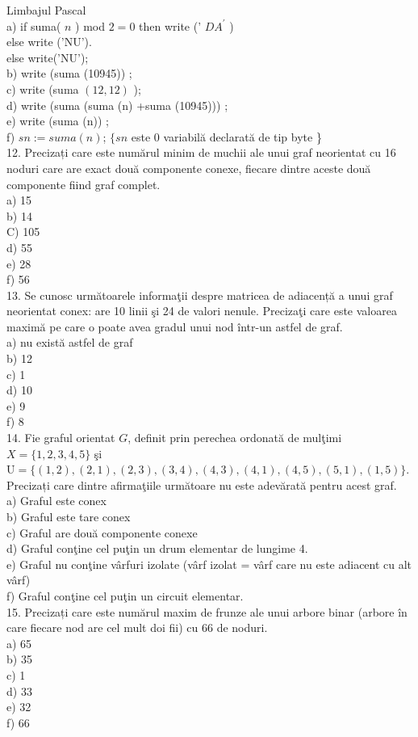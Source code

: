 Limbajul Pascal\\
a) if suma( $n$ ) mod $2=0$ then write (' $D A^{\prime}$ )\\
else write ('NU').\\
else write('NU');\\
b) write (suma (10945)) ;\\
c) write (suma $(12,12)$ );\\
d) write (suma (suma (n) +suma (10945))) ;\\
e) write (suma (n)) ;\\
f) $s n:=s u m a(n)$; $\{s n$ este 0 variabilă declarată de tip byte \}\\
12. Precizați care este numărul minim de muchii ale unui graf neorientat cu 16 noduri care are exact două componente conexe, fiecare dintre aceste două componente fiind graf complet.\\
a) 15\\
b) 14\\
C) 105\\
d) 55\\
e) 28\\
f) 56\\
13. Se cunosc următoarele informaţii despre matricea de adiacență a unui graf neorientat conex: are 10 linii şi 24 de valori nenule. Precizaţi care este valoarea maximă pe care o poate avea gradul unui nod într-un astfel de graf.\\
a) nu există astfel de graf\\
b) 12\\
c) 1\\
d) 10\\
e) 9\\
f) 8\\
14. Fie graful orientat $G$, definit prin perechea ordonată de mulţimi $X=\{1,2,3,4,5\}$ şi $\mathrm{U}=\{(1,2),(2,1),(2,3),(3,4),(4,3),(4,1),(4,5),(5,1),(1,5)\}$.\\
Precizați care dintre afirmaţiile următoare nu este adevărată pentru acest graf.\\
a) Graful este conex\\
b) Graful este tare conex\\
c) Graful are două componente conexe\\
d) Graful conţine cel puţin un drum elementar de lungime 4.\\
e) Graful nu conţine vârfuri izolate (vârf izolat = vârf care nu este adiacent cu alt vârf)\\
f) Graful conţine cel puţin un circuit elementar.\\
15. Precizați care este numărul maxim de frunze ale unui arbore binar (arbore în care fiecare nod are cel mult doi fii) cu 66 de noduri.\\
a) 65\\
b) 35\\
c) 1\\
d) 33\\
e) 32\\
f) 66

